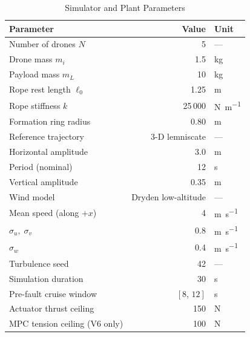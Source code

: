 \documentclass[lettersize,journal]{IEEEtran}
\begin{document}
\begin{table}[htbp]
  \caption{Simulator and Plant Parameters}
  \label{tab:sim-params}
  \centering
  \begin{tabular}{lrl}
    \toprule
    Parameter                        & Value     & Unit                       \\
    \midrule
    Number of drones $N$             & 5         & ---                        \\
    Drone mass $m_i$                 & 1.5       & \si{\kilo\gram}            \\
    Payload mass $m_L$               & 10        & \si{\kilo\gram}            \\
    Rope rest length $\ell_0$        & 1.25      & \si{\metre}                \\
    Rope stiffness $k$               & 25\,000   & \si{\newton\per\metre}     \\
    Formation ring radius            & 0.80      & \si{\metre}                \\
    Reference trajectory             & 3-D lemniscate & ---               \\
    \quad Horizontal amplitude       & 3.0       & \si{\metre}                \\
    \quad Period (nominal)           & 12        & \si{\second}               \\
    \quad Vertical amplitude         & 0.35      & \si{\metre}                \\
    Wind model                       & Dryden low-altitude & ---          \\
    \quad Mean speed (along $+x$)    & 4         & \si{\metre\per\second}     \\
    \quad $\sigma_u,\;\sigma_v$      & 0.8       & \si{\metre\per\second}     \\
    \quad $\sigma_w$                 & 0.4       & \si{\metre\per\second}     \\
    Turbulence seed                  & 42        & ---                        \\
    Simulation duration              & 30        & \si{\second}               \\
    Pre-fault cruise window          & $[8,\,12]$  & \si{\second}             \\
    Actuator thrust ceiling          & 150       & \si{\newton}               \\
    MPC tension ceiling (V6 only)    & 100       & \si{\newton}               \\
    \bottomrule
  \end{tabular}
\end{table}
\end{document}
